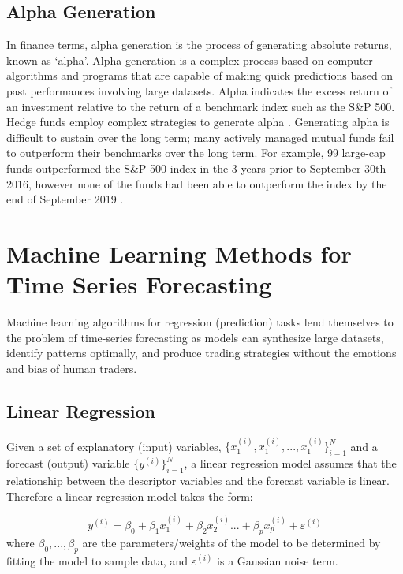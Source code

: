 \subsection{Alpha Generation}

In finance terms, alpha generation is the process of generating absolute returns, known as `alpha'. Alpha generation is a complex process based on computer algorithms and programs that are capable of making quick predictions based on past performances involving large datasets. Alpha indicates the excess return of an investment relative to the return of a benchmark index such as the S\&P 500. Hedge funds employ complex strategies to generate alpha \cite{alpha_hf}. Generating alpha is difficult to sustain over the long term; many actively managed mutual funds fail to outperform their benchmarks over the long term. For example, 99 large-cap funds outperformed the S\&P 500 index in the 3 years prior to September 30th 2016, however none of the funds had been able to outperform the index by the end of September 2019 \cite{alpha_ch}. 

\section{Machine Learning Methods for Time Series Forecasting}
Machine learning algorithms for regression (prediction) tasks lend themselves to the problem of time-series forecasting as models can synthesize large datasets, identify patterns optimally, and produce trading strategies without the emotions and bias of human traders. 

\subsection{Linear Regression}
Given a set of explanatory (input) variables, $\{x_1^{(i)}, x_1^{(i)},  ..., x_1^{(i)}\}_{i=1}^N$ and a forecast (output) variable $\{y^{(i)}\}_{i=1}^N$, a linear regression model assumes that the relationship between the descriptor variables and the forecast variable is linear. Therefore a linear regression model takes the form:

\begin{equation*}
    y^{(i)} = \beta_0 + \beta_1x_1^{(i)} + \beta_2x_2^{(i)} ... + \beta_px_p^{(i)} + \varepsilon^{(i)}
\end{equation*}
where $\beta_0, ... , \beta_p$ are the parameters/weights of the model to be determined by fitting the model to sample data, and $\varepsilon^{(i)}$ is a Gaussian noise term. 

